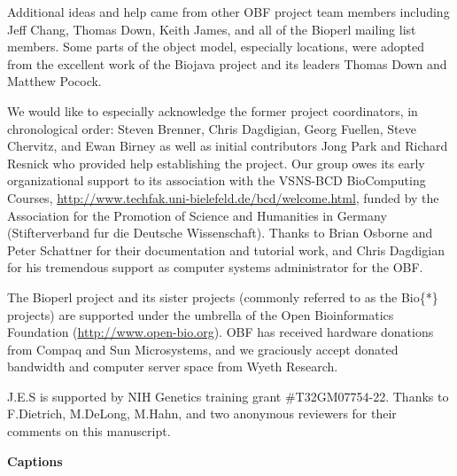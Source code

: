 \documentclass[12pt]{article}
\begin{document}
Additional ideas and help came from other OBF project team members
including Jeff Chang, Thomas Down, Keith James, and all of the Bioperl
mailing list members.  Some parts of the object model, especially
locations, were adopted from the excellent work of the Biojava project
and its leaders Thomas Down and Matthew Pocock.


% 

We would like to especially acknowledge the former project
coordinators, in chronological order: Steven Brenner, Chris Dagdigian,
Georg Fuellen, Steve Chervitz, and Ewan Birney as well as initial
contributors Jong Park and Richard Resnick who provided help
establishing the project.  Our group owes its early organizational
support to its association with the VSNS-BCD BioComputing Courses,
\url{http://www.techfak.uni-bielefeld.de/bcd/welcome.html}, funded by
the Association for the Promotion of Science and Humanities in Germany
(Stifterverband fur die Deutsche Wissenschaft).  Thanks to Brian
Osborne and Peter Schattner for their documentation and tutorial work,
and Chris Dagdigian for his tremendous support as computer systems
administrator for the OBF.

The Bioperl project and its sister projects (commonly referred to as
the Bio\{*\} projects) are supported under the umbrella of the Open
Bioinformatics Foundation (\url{http://www.open-bio.org}).  OBF has
received hardware donations from Compaq and Sun Microsystems, and we
graciously accept donated bandwidth and computer server space from
Wyeth Research.

J.E.S is supported by NIH Genetics training grant \#T32GM07754-22.
Thanks to F.Dietrich, M.DeLong, M.Hahn, and two anonymous reviewers
for their comments on this manuscript.


 

\newpage

\begin{center}{\large \textbf{Captions}}\end{center}
\end{document}
